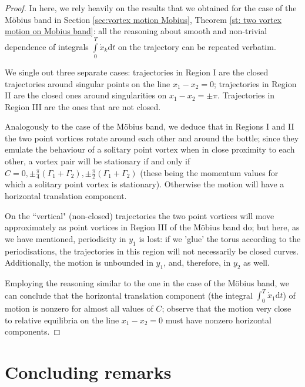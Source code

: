 \documentclass[11pt,twoside]{article}
\theoremstyle{definition}
\numberwithin{equation}{section}
\begin{document}
\begin{proof}
In here, we rely heavily on the results that we obtained for the case of the M\"obius band in Section \ref{sec:vortex motion Mobius}, Theorem \ref{st: two vortex motion on Mobius band}: all the reasoning about smooth and non-trivial dependence of integrals $\int\limits_0^T\dot{x}_k\mathrm{d}t$ on the trajectory can be repeated verbatim. 

We single out three separate cases: trajectories  in Region I are the closed trajectories around singular points on the line $x_1-x_2 = 0$; trajectories in Region II are the closed ones around singularities on $x_1-x_2 = \pm\pi$. 
Trajectories in Region III are the ones that are not closed. 

Analogously to the case of the M\"obius band, we deduce that in Regions I and II the two point vortices rotate around each other and around the bottle; since they emulate the behaviour of a solitary point vortex when in close proximity to each other, a vortex pair will be stationary if and only if $C = 0, \pm\frac{\pi}{4}(\Gamma_1 + \Gamma_2),\pm\frac{\pi}{2}(\Gamma_1  + \Gamma_2)$ (these being the momentum values for which a solitary point vortex is stationary). Otherwise the motion will have a horizontal translation component. 

On the ``vertical" (non-closed) trajectories the two point vortices will move approximately as  point vortices in Region III of the M\"obius band do; but here, as we have mentioned, periodicity in $y_1$ is lost: if we 'glue' the torus according to the periodisations, the trajectories in this region will not necessarily be closed curves. Additionally, the motion is unbounded in $y_1$, and, therefore, in $y_2$ as well. 


Employing the reasoning similar to the one in the case of the  M\"obius band,  we can conclude that the horizontal translation component (the integral $\int_0^T\dot{x}_1\mathrm{d}t$) of motion is nonzero for almost all values of $C$;  observe  that the motion very close to  relative equilibria on the line $x_1-x_2=0$ must have nonzero horizontal components.  


\end{proof}





\section{Concluding remarks}
\end{document}
